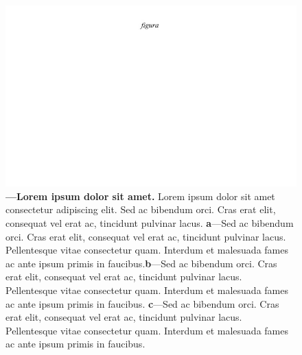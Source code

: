 \documentclass[./main.tex]{subfiles}
\begin{document}
\begin{figure}[t!] 
\centering				
\includegraphics[width=0.98\linewidth]{figs/fig_m.jpg}		
\caption[Lorem ipsum dolor sit amet]
{\textbf{---\;Lorem ipsum dolor sit amet.}
    Lorem ipsum dolor sit amet consectetur adipiscing elit. Sed ac bibendum orci. Cras erat elit, consequat vel erat ac, tincidunt pulvinar lacus. \;\textbf{a}\;---\;Sed ac bibendum orci. Cras erat elit, consequat vel erat ac, tincidunt pulvinar lacus. Pellentesque vitae consectetur quam. Interdum et malesuada fames ac ante ipsum primis in faucibus.\;\textbf{b}\;---\;Sed ac bibendum orci. Cras erat elit, consequat vel erat ac, tincidunt pulvinar lacus. Pellentesque vitae consectetur quam. Interdum et malesuada fames ac ante ipsum primis in faucibus. \;\textbf{c}\;---\;Sed ac bibendum orci. Cras erat elit, consequat vel erat ac, tincidunt pulvinar lacus. Pellentesque vitae consectetur quam. Interdum et malesuada fames ac ante ipsum primis in faucibus.
}
\label{fig:hydro:intro} 		
\end{figure}
\end{document}
